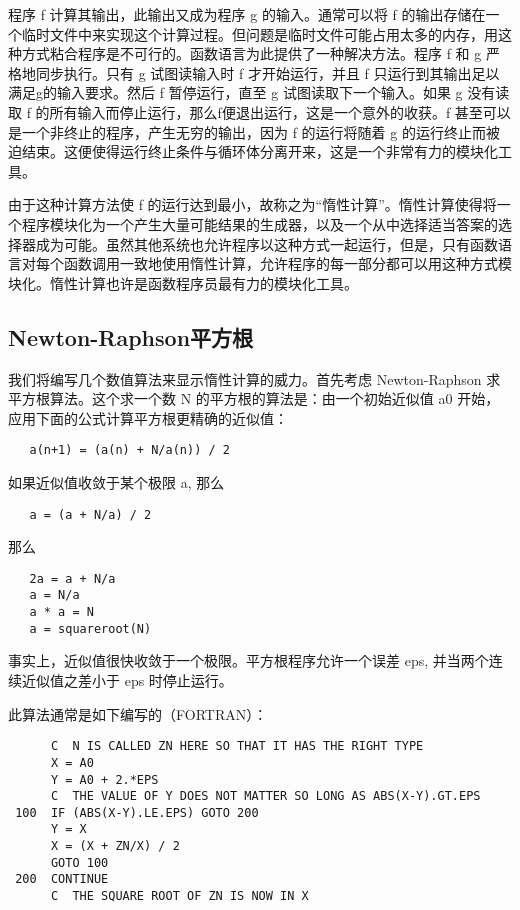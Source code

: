 \documentclass[12pt]{article}
\begin{document}
程序 f 计算其输出，此输出又成为程序 g 的输入。通常可以将 f 的输出存储在一个临时文件中来实现这个计算过程。但问题是临时文件可能占用太多的内存，用这种方式粘合程序是不可行的。函数语言为此提供了一种解决方法。程序 f 和 g 严格地同步执行。只有 g 试图读输入时 f 才开始运行，并且 f 只运行到其输出足以满足g的输入要求。然后 f 暂停运行，直至 g 试图读取下一个输入。如果 g 没有读取 f 的所有输入而停止运行，那么f便退出运行，这是一个意外的收获。f 甚至可以是一个非终止的程序，产生无穷的输出，因为 f 的运行将随着 g 的运行终止而被迫结束。这便使得运行终止条件与循环体分离开来，这是一个非常有力的模块化工具。

由于这种计算方法使 f 的运行达到最小，故称之为``惰性计算''。惰性计算使得将一个程序模块化为一个产生大量可能结果的生成器，以及一个从中选择适当答案的选择器成为可能。虽然其他系统也允许程序以这种方式一起运行，但是，只有函数语言对每个函数调用一致地使用惰性计算，允许程序的每一部分都可以用这种方式模块化。惰性计算也许是函数程序员最有力的模块化工具。

\subsection{Newton-Raphson平方根}

我们将编写几个数值算法来显示惰性计算的威力。首先考虑 Newton-Raphson 求平方根算法。这个求一个数 N 的平方根的算法是：由一个初始近似值 a0 开始，应用下面的公式计算平方根更精确的近似值：

\begin{verbatim}
   a(n+1) = (a(n) + N/a(n)) / 2
\end{verbatim}

如果近似值收敛于某个极限 a, 那么

\begin{verbatim}
   a = (a + N/a) / 2
\end{verbatim}

那么

\begin{verbatim}
   2a = a + N/a
   a = N/a
   a * a = N
   a = squareroot(N)
\end{verbatim}

事实上，近似值很快收敛于一个极限。平方根程序允许一个误差 eps, 并当两个连续近似值之差小于 eps 时停止运行。

此算法通常是如下编写的（FORTRAN）：

\begin{verbatim}
      C  N IS CALLED ZN HERE SO THAT IT HAS THE RIGHT TYPE
      X = A0
      Y = A0 + 2.*EPS
      C  THE VALUE OF Y DOES NOT MATTER SO LONG AS ABS(X-Y).GT.EPS
 100  IF (ABS(X-Y).LE.EPS) GOTO 200
      Y = X
      X = (X + ZN/X) / 2
      GOTO 100
 200  CONTINUE
      C  THE SQUARE ROOT OF ZN IS NOW IN X
\end{verbatim}
\end{document}
